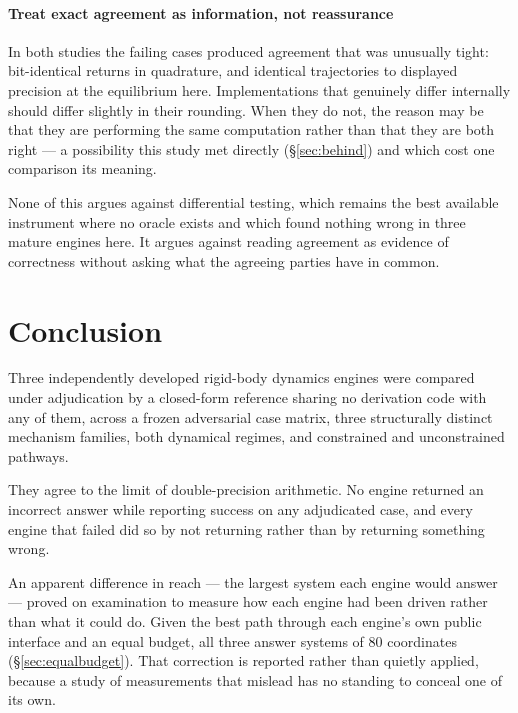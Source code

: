 \documentclass[review,12pt]{elsarticle}
\begin{document}
\paragraph{Treat exact agreement as information, not reassurance}
In both studies the failing cases produced agreement that was unusually tight:
bit-identical returns in quadrature, and identical trajectories to displayed
precision at the equilibrium here. Implementations that genuinely differ
internally should differ slightly in their rounding. When they do not, the
reason may be that they are performing the same computation rather than that
they are both right --- a possibility this study met directly (\S\ref{sec:behind})
and which cost one comparison its meaning.

None of this argues against differential testing, which remains the best available
instrument where no oracle exists and which found nothing wrong in three mature
engines here. It argues against reading agreement as evidence of correctness
without asking what the agreeing parties have in common.



\section{Conclusion}

Three independently developed rigid-body dynamics engines were compared under
adjudication by a closed-form reference sharing no derivation code with any of
them,
across a frozen adversarial case matrix, three structurally distinct mechanism
families, both dynamical regimes, and constrained and unconstrained pathways.

They agree to the limit of double-precision arithmetic. No engine returned an
incorrect answer while reporting success on any adjudicated case, and every
engine that failed did so by not returning rather than by returning something
wrong.

An apparent difference in reach --- the largest system each engine would
answer --- proved on examination to measure how each engine had been driven
rather than what it could do. Given the best path through each engine's own
public interface and an equal budget, all three answer systems of 80
coordinates (\S\ref{sec:equalbudget}). That correction is reported rather than
quietly applied, because a study of measurements that mislead has no standing
to conceal one of its own.
\end{document}
